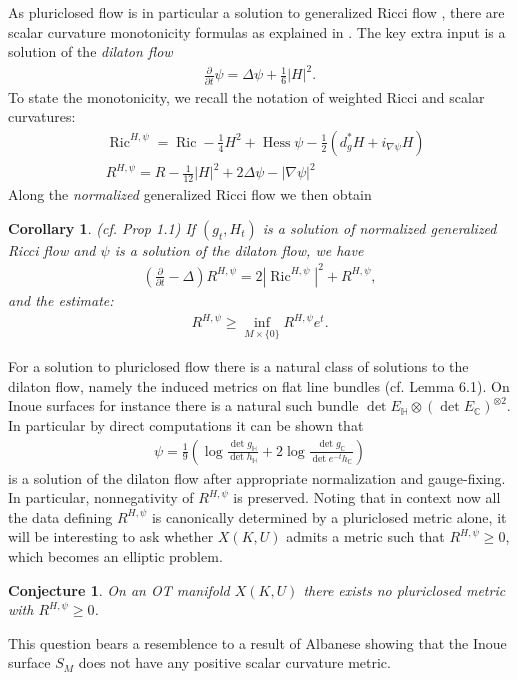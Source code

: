 \documentclass[12pt]{amsart}
\numberwithin{equation}{section}
\newtheorem{cor}[prop]{Corollary}
\newtheorem{conj}[prop]{Conjecture}
\numberwithin{prop}{section}
\theoremstyle{definition}
\newcommand{\dt}{\frac{\partial}{\partial t}}
\newcommand{\brs}[1]{\left| #1 \right|}
\newcommand{\gD}{\Delta}
\begin{document}
As pluriclosed flow is in particular a solution to generalized Ricci flow \cite{PCFReg}, there are scalar curvature monotonicity formulas as explained in \cite{Streetsscalar}.  The key extra input is a solution of the \emph{dilaton flow}
\begin{align*}
    \dt \psi = \gD \psi + \tfrac{1}{6} \brs{H}^2.
\end{align*}
To state the  monotonicity, we recall the notation of weighted Ricci and scalar curvatures:
\begin{align*}
&\operatorname{Ric}^{H,\psi}=\operatorname{Ric}-\frac{1}{4}H^2 + \operatorname{Hess}\psi- \frac{1}{2}(d_g^* H + i_{\nabla \psi}H)\\
    &R^{H,\psi}=R-\frac{1}{12}|H|^2 + 2\Delta \psi -|\nabla \psi|^2
\end{align*}
Along the \emph{normalized} generalized Ricci flow we then obtain 
\begin{cor}(cf. \cite{Streetsscalar} Prop 1.1) If $(g_t, H_t)$ is a solution of normalized generalized Ricci flow and $\psi$ is a solution of the dilaton flow, we have
\begin{align*}
    \left(\dt - \Delta \right) R^{H,\psi} = 2 |\operatorname{Ric}^{H,\psi}|^2 + R^{H,\psi},
\end{align*}
and the estimate:
\begin{align*}
    R^{H,\psi} \geq \inf_{M\times\{0\}}R^{H,\psi}e^{t}.
\end{align*}
\end{cor}

For a solution to pluriclosed flow there is a natural class of solutions to the dilaton flow, namely the induced metrics on flat line bundles (cf. 
\cite{StreetsPCFBI} Lemma 6.1).  On Inoue surfaces for instance there is a natural such bundle $\det E_{\mathbb H} \otimes (\det E_{\mathbb C})^{\otimes 2}$.  In particular by direct computations it can be shown that
\begin{align*}
    \psi = \frac{1}{9} \left(\operatorname{log}\frac{\det g_\mathbb{H}}{\det h_\mathbb{H}}+2\log\frac{\det g_\mathbb{C}}{\det e^{-t}h_\mathbb{C}} \right)
\end{align*}
is a solution of the dilaton flow after appropriate normalization and gauge-fixing.   In particular,  nonnegativity of $R^{H,\psi}$ is preserved.  Noting that in context now all the data defining $R^{H,\psi}$ is canonically determined by a pluriclosed metric alone, it will be interesting to ask whether $X(K,U)$ admits a metric such that $R^{H,\psi} \geq 0$, which becomes an elliptic problem. 
\begin{conj}
    On an OT manifold $X(K,U)$ there exists no pluriclosed metric with $R^{H,\psi}\geq0$.
\end{conj}
\noindent This question bears a resemblence to a result of Albanese \cite{AlbYambeInoue} showing that the Inoue surface $S_M$ does not have any positive scalar curvature metric.
\end{document}
